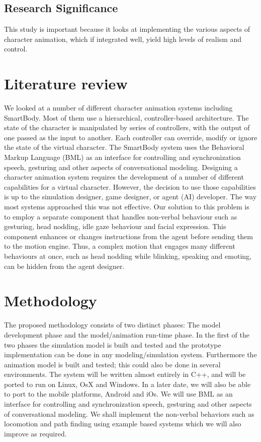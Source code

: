 \documentclass[options]{article}
\begin{document}
\subsection{\textbf{Research Significance}}
This study is important because it looks at implementing the various aspects of character animation, which if integrated well, yield high levels of realism and control.



\section{\textbf{Literature review}}
We looked at a number of different character animation systems including SmartBody. Most of them use a hierarchical, controller-based architecture. The state of the character is manipulated by series of controllers, with the output of one passed as the input to another. Each controller can override, modify or ignore the state of the virtual character. The SmartBody system uses the Behavioral Markup Language (BML) as an interface for controlling and synchronization speech, gesturing and other aspects of conversational modeling. \bigbreak
Designing a character animation system requires the development of a number of different capabilities for a virtual character. However, the decision to use those capabilities is up to the simulation designer, game designer, or agent (AI) developer. The way most systems approached this was not effective.\bigbreak
Our solution to this problem is to employ a separate component that handles non-verbal behaviour such as gesturing, head nodding, idle gaze behaviour and facial expression. This component enhances or changes instructions from the agent before sending them to the motion engine. Thus, a complex motion that engages many different behaviours at once, such as head nodding while blinking, speaking and emoting, can be hidden from the agent designer.



\section{\textbf{Methodology}}
The proposed methodology consists of two distinct phases: The model development phase and the model/animation run-time phase. In the first of the two phases the simulation model is built and tested and the prototype implementation can be done in any modeling/simulation system. Furthermore the animation model is built and tested; this could also be done in several environments. \bigbreak
The system will be written almost entirely in C++, and will be ported to run on Linux, OsX and Windows. In a later date, we will also be able to port to the mobile platforms, Android and iOs.\bigbreak
We will use BML as an interface for controlling and synchronization speech, gesturing and other aspects of conversational modeling.
We shall implement the non-verbal behaviors such as locomotion and path finding using example based systems which we will also improve as required.
\end{document}
